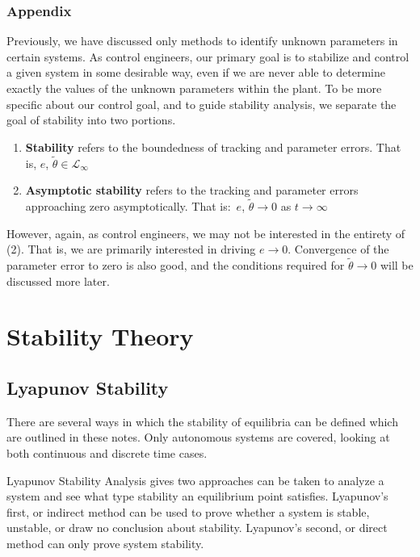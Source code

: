 \subsection{Appendix}

Previously, we have discussed only methods to identify unknown parameters in certain systems.
As control engineers, our primary goal is to stabilize and control a given system in some desirable way, even if we are never able to determine exactly the values of the unknown parameters within the plant.
To be more specific about our control goal, and to guide stability analysis, we separate the goal of stability into two portions.
\begin{enumerate}
  \setlength{\itemsep}{0pt}
  \item{\textbf{Stability} refers to the boundedness of tracking and parameter errors.
  That is, $e$, $\tilde{\theta}\in\mathcal{L}_{\infty}$}
  \item{\textbf{Asymptotic stability} refers to the tracking and parameter errors approaching zero asymptotically.
  That is:\ $e$, $\tilde{\theta}\rightarrow0$ as $t\rightarrow\infty$}
\end{enumerate}
However, again, as control engineers, we may not be interested in the entirety of (2).
That is, we are primarily interested in driving $e\rightarrow0$.
Convergence of the parameter error to zero is also good, and the conditions required for $\tilde{\theta}\rightarrow0$ will be discussed more later.

\chapter{Stability Theory}

\section{Lyapunov Stability}

There are several ways in which the stability of equilibria can be defined which are outlined in these notes.
Only autonomous systems are covered, looking at both continuous and discrete time cases.

Lyapunov Stability Analysis gives two approaches can be taken to analyze a system and see what type stability an equilibrium point satisfies.
Lyapunov's first, or indirect method can be used to prove whether a system is stable, unstable, or draw no conclusion about stability.
Lyapunov's second, or direct method can only prove system stability.

